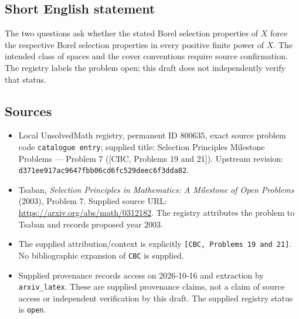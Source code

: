 \documentclass[11pt]{article}
\begin{document}
\subsection{Short English statement}
The two questions ask whether the stated Borel selection properties of \(X\) force the respective Borel selection properties in every positive finite power of \(X\). The intended class of spaces and the cover conventions require source confirmation. The registry labels the problem open; this draft does not independently verify that status.
\subsection{Sources}
\begin{itemize}
\item Local UnsolvedMath registry, permanent ID \(800635\), exact source problem code \texttt{catalogue entry}; supplied title: Selection Principles Milestone Problems --- Problem 7 ([CBC, Problems 19 and 21]). Upstream revision: \texttt{d371ee917ac9647fbb06cd6fc529deec6f3dda82}.
\item Tsaban, \emph{Selection Principles in Mathematics: A Milestone of Open Problems} (2003), Problem 7. Supplied source URL: \url{https://arxiv.org/abs/math/0312182}. The registry attributes the problem to Tsaban and records proposed year 2003.
\item The supplied attribution/context is explicitly \texttt{[CBC, Problems 19 and 21]}. No bibliographic expansion of \texttt{CBC} is supplied.
\item Supplied provenance records access on 2026-10-16 and extraction by \texttt{arxiv\_latex}. These are supplied provenance claims, not a claim of source access or independent verification by this draft. The supplied registry status is \texttt{open}.
\end{itemize}
\end{document}
